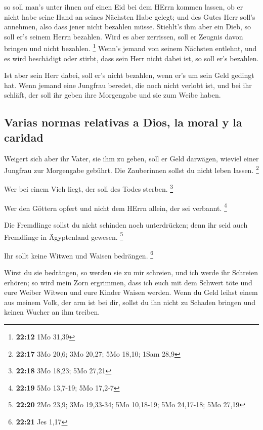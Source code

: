  so soll man's unter ihnen auf einen Eid bei dem HErrn
kommen lassen, ob er nicht habe seine Hand an seines Nächsten Habe
gelegt; und des Gutes Herr soll's annehmen, also dass jener nicht
bezahlen müsse.  Stiehlt's ihm aber ein Dieb, so soll
er's seinem Herrn bezahlen.  Wird es aber zerrissen, soll
er Zeugnis davon bringen und nicht bezahlen. \footnote{\textbf{22:12}
  1Mo 31,39}  Wenn's jemand von seinem Nächsten entlehnt,
und es wird beschädigt oder stirbt, dass sein Herr nicht dabei ist, so
soll er's bezahlen.

 Ist aber sein Herr dabei, soll er's nicht bezahlen, wenn
er's um sein Geld gedingt hat.  Wenn jemand eine Jungfrau
beredet, die noch nicht verlobt ist, und bei ihr schläft, der soll ihr
geben ihre Morgengabe und sie zum Weibe haben.

\hypertarget{varias-normas-relativas-a-dios-la-moral-y-la-caridad}{%
\subsection{Varias normas relativas a Dios, la moral y la
caridad}\label{varias-normas-relativas-a-dios-la-moral-y-la-caridad}}

 Weigert sich aber ihr Vater, sie ihm zu geben, soll er
Geld darwägen, wieviel einer Jungfrau zur Morgengabe gebührt.
 Die Zauberinnen sollst du nicht leben lassen.
\footnote{\textbf{22:17} 3Mo 20,6; 3Mo 20,27; 5Mo 18,10; 1Sam 28,9}

 Wer bei einem Vieh liegt, der soll des Todes sterben.
\footnote{\textbf{22:18} 3Mo 18,23; 5Mo 27,21}

 Wer den Göttern opfert und nicht dem HErrn allein, der
sei verbannt. \footnote{\textbf{22:19} 5Mo 13,7-19; 5Mo 17,2-7}

 Die Fremdlinge sollst du nicht schinden noch
unterdrücken; denn ihr seid auch Fremdlinge in Ägyptenland gewesen.
\footnote{\textbf{22:20} 2Mo 23,9; 3Mo 19,33-34; 5Mo 10,18-19; 5Mo
  24,17-18; 5Mo 27,19}

 Ihr sollt keine Witwen und Waisen bedrängen. \footnote{\textbf{22:21}
  Jes 1,17}

 Wirst du sie bedrängen, so werden sie zu mir schreien,
und ich werde ihr Schreien erhören;  so wird mein Zorn
ergrimmen, dass ich euch mit dem Schwert töte und eure Weiber Witwen und
eure Kinder Waisen werden.  Wenn du Geld leihst einem aus
meinem Volk, der arm ist bei dir, sollst du ihn nicht zu Schaden bringen
und keinen Wucher an ihm treiben.

